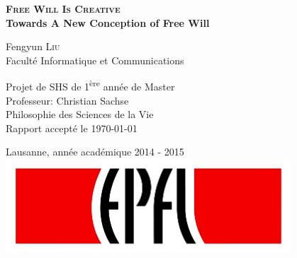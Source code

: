 \begin{titlepage}

  \begin{center}

    \vspace*{3\baselineskip}
    \textsc{\Large \bfseries Free Will Is Creative \\[0.4cm] }
    {\bfseries Towards A New Conception of Free Will \\[1.5cm] }

    \noindent
    Fengyun \textsc{Liu} \\[0.3cm]

    \noindent
    { Faculté Informatique et Communications \\[2cm]}

    \begin{framed}
    Projet de SHS de 1\textsuperscript{ère} année de Master \\
    Professeur: Christian Sachse \\
    Philosophie des Sciences de la Vie \\
    Rapport accepté le \today
    \end{framed}

    \noindent
    Lausanne, année académique 2014 - 2015 \\[1cm]

    \includegraphics[width=0.8\textwidth]{img/epfl}~\\[1cm]



  \end{center}

\end{titlepage}

